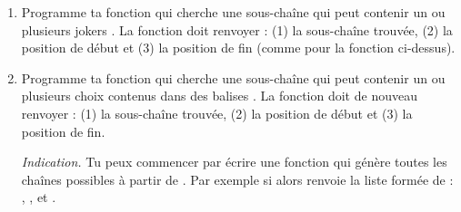\documentclass[11pt,class=report,crop=false]{standalone}
\begin{document}
\begin{activite}


\begin{enumerate}
  \item Programme ta fonction 
  qui cherche une sous-chaîne qui peut contenir un ou plusieurs jokers \og{}\fg{}.
  La fonction doit renvoyer : (1) la sous-chaîne trouvée, (2) la position de début et (3) la position de fin (comme pour la fonction  ci-dessus).
  
  
  \item Programme ta fonction 
  qui cherche une sous-chaîne qui peut contenir un ou plusieurs choix contenus dans des balises \og{}\mot{[]}\fg{}. La fonction doit de nouveau renvoyer : (1) la sous-chaîne trouvée, (2) la position de début et (3) la position de fin.  
  
  \emph{Indication.} Tu peux commencer par écrire une fonction  qui génère toutes les chaînes possibles à partir de . Par exemple si 
   alors  renvoie la liste formée de :
  , ,  et .
    
\end{enumerate}   
     
\end{activite}


\newcommand{\rzero}{{\color{red}\textbf{0}}}
\newcommand{\run}{{\color{blue}\textbf{1}}}
\end{document}
